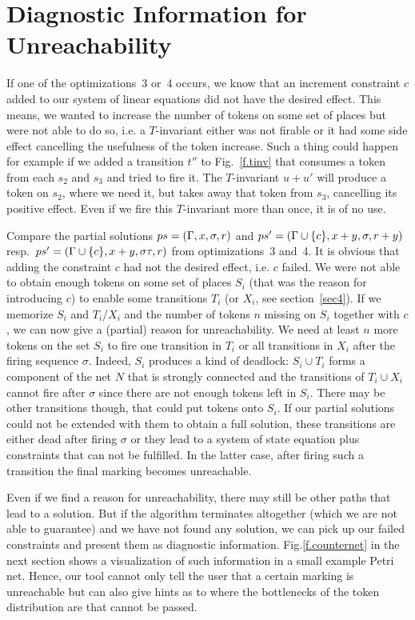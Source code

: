 \documentclass{LMCS}
\begin{document}
\section{Diagnostic Information for Unreachability}\label{sec7}

If one of the optimizations~3 or~4 occurs, we know that an increment constraint $c$ added to our system of linear equations
did not have the desired effect. This means, we wanted to increase the number of tokens on some set of places but
were not able to do so, i.e. a $T$-invariant either was not firable or it had some side effect cancelling the usefulness
of the token increase. Such a thing could happen for example if we added a transition $t''$ to Fig.~\ref{f.tinv}
that consumes a token from each $s_2$ and $s_3$ and tried to fire it. The $T$-invariant $u+u'$ will produce a token on $s_2$, where we need
it, but takes away that token from $s_3$, cancelling its positive effect. Even if we fire this $T$-invariant more
than once, it is of no use.

Compare the partial solutions $ps=({\Gamma},x,\sigma,r)$ and $ps'=({\Gamma}\cup\{c\},x+y,\sigma,r+y)$
resp.\ $ps'=({\Gamma}\cup\{c\},x+y,\sigma\tau,r)$ from optimizations~3 and~4. It is obvious that
adding the constraint $c$ had not the desired effect, i.e. $c$ failed. We were not able to
obtain enough tokens on some set of places $S_i$ (that was the reason for introducing $c$) to
enable some transitions $T_i$ (or $X_i$, see section~\ref{sec4}). If we memorize $S_i$ and 
$T_i$/$X_i$ and the number of tokens $n$ missing on $S_i$ together with $c$, we can now give a 
(partial) reason for unreachability. We need at least $n$ more tokens on the set $S_i$
to fire one transition in $T_i$ or all transitions in $X_i$ after the firing sequence $\sigma$.
Indeed, $S_i$ produces a kind of deadlock: $S_i \cup T_i$ forms a component of the net $N$
that is strongly connected and the transitions of $T_i\cup X_i$ cannot fire after $\sigma$
since there are not enough tokens left in $S_i$. There may be other transitions though, that could put
tokens onto $S_i$. If our partial solutions could not be extended with them to obtain a
full solution, these transitions are either dead after firing $\sigma$ or they lead to a
system of state equation plus constraints that can not be fulfilled. In the latter case,
after firing such a transition the final marking becomes unreachable.

Even if we find a reason for unreachability, there may still be other paths that lead
to a solution. But if the algorithm terminates altogether (which we are not able to 
guarantee) and we have not found any solution, we can pick up our failed constraints
and present them as diagnostic information. Fig.\ref{f.counternet} in the next section shows a visualization
of such information in a small example Petri net. Hence, our tool cannot
only tell the user that a certain marking is unreachable but can also give hints as to where the
bottlenecks of the token distribution are that cannot be passed.  
\end{document}
